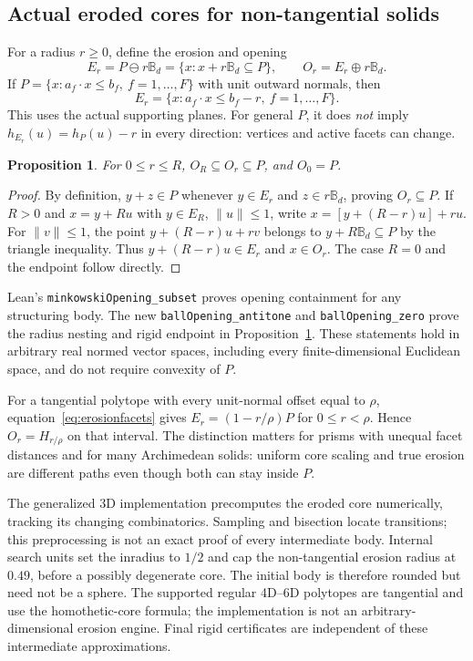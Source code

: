 \documentclass[11pt,a4paper]{article}
\newcommand{\B}{\mathbb B}
\newcommand{\code}[1]{\texttt{\nolinkurl{#1}}}
\newtheorem{proposition}{Proposition}
\begin{document}
\subsection{Actual eroded cores for non-tangential solids}
For a radius $r\geq0$, define the erosion and opening
\begin{equation}\label{eq:opening}
E_r=P\ominus r\B_d=\{x:x+r\B_d\subseteq P\},\qquad
O_r=E_r\oplus r\B_d.
\end{equation}
If $P=\{x:a_f\cdot x\leq b_f,\ f=1,\ldots,F\}$ with unit outward normals, then
\begin{equation}\label{eq:erosionfacets}
E_r=\{x:a_f\cdot x\leq b_f-r,\ f=1,\ldots,F\}.
\end{equation}
This uses the actual supporting planes. For general $P$, it does \emph{not} imply $h_{E_r}(u)=h_P(u)-r$ in every direction: vertices and active facets can change.

\begin{proposition}\label{prop:opening}
For $0\leq r\leq R$, $O_R\subseteq O_r\subseteq P$, and $O_0=P$.
\end{proposition}
\begin{proof}
By definition, $y+z\in P$ whenever $y\in E_r$ and $z\in r\B_d$, proving $O_r\subseteq P$. If $R>0$ and $x=y+Ru$ with $y\in E_R$, $\|u\|\leq1$, write
$x=[y+(R-r)u]+ru$. For $\|v\|\leq1$, the point
$y+(R-r)u+rv$ belongs to $y+R\B_d\subseteq P$ by the triangle inequality. Thus $y+(R-r)u\in E_r$ and $x\in O_r$. The case $R=0$ and the endpoint follow directly.
\end{proof}

Lean's \code{minkowskiOpening_subset} proves opening containment for any structuring body. The new \code{ballOpening_antitone} and \code{ballOpening_zero} prove the radius nesting and rigid endpoint in Proposition~\ref{prop:opening}. These statements hold in arbitrary real normed vector spaces, including every finite-dimensional Euclidean space, and do not require convexity of $P$.

For a tangential polytope with every unit-normal offset equal to $\rho$, equation~\eqref{eq:erosionfacets} gives
$E_r=(1-r/\rho)P$ for $0\leq r<\rho$. Hence $O_r=H_{r/\rho}$ on that interval. The distinction matters for prisms with unequal facet distances and for many Archimedean solids: uniform core scaling and true erosion are different paths even though both can stay inside $P$.

The generalized 3D implementation precomputes the eroded core numerically, tracking its changing combinatorics. Sampling and bisection locate transitions; this preprocessing is not an exact proof of every intermediate body. Internal search units set the inradius to $1/2$ and cap the non-tangential erosion radius at $0.49$, before a possibly degenerate core. The initial body is therefore rounded but need not be a sphere. The supported regular 4D--6D polytopes are tangential and use the homothetic-core formula; the implementation is not an arbitrary-dimensional erosion engine. Final rigid certificates are independent of these intermediate approximations.
\end{document}
